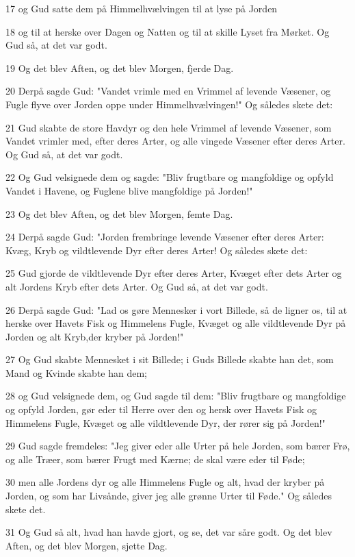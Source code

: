 \par 17 og Gud satte dem på Himmelhvælvingen til at lyse på Jorden
\par 18 og til at herske over Dagen og Natten og til at skille Lyset fra Mørket. Og Gud så, at det var godt.
\par 19 Og det blev Aften, og det blev Morgen, fjerde Dag.
\par 20 Derpå sagde Gud: "Vandet vrimle med en Vrimmel af levende Væsener, og Fugle flyve over Jorden oppe under Himmelhvælvingen!" Og således skete det:
\par 21 Gud skabte de store Havdyr og den hele Vrimmel af levende Væsener, som Vandet vrimler med, efter deres Arter, og alle vingede Væsener efter deres Arter. Og Gud så, at det var godt.
\par 22 Og Gud velsignede dem og sagde: "Bliv frugtbare og mangfoldige og opfyld Vandet i Havene, og Fuglene blive mangfoldige på Jorden!"
\par 23 Og det blev Aften, og det blev Morgen, femte Dag.
\par 24 Derpå sagde Gud: "Jorden frembringe levende Væsener efter deres Arter: Kvæg, Kryb og vildtlevende Dyr efter deres Arter! Og således skete det:
\par 25 Gud gjorde de vildtlevende Dyr efter deres Arter, Kvæget efter dets Arter og alt Jordens Kryb efter dets Arter. Og Gud så, at det var godt.
\par 26 Derpå sagde Gud: "Lad os gøre Mennesker i vort Billede, så de ligner os, til at herske over Havets Fisk og Himmelens Fugle, Kvæget og alle vildtlevende Dyr på Jorden og alt Kryb,der kryber på Jorden!"
\par 27 Og Gud skabte Mennesket i sit Billede; i Guds Billede skabte han det, som Mand og Kvinde skabte han dem;
\par 28 og Gud velsignede dem, og Gud sagde til dem: "Bliv frugtbare og mangfoldige og opfyld Jorden, gør eder til Herre over den og hersk over Havets Fisk og Himmelens Fugle, Kvæget og alle vildtlevende Dyr, der rører sig på Jorden!"
\par 29 Gud sagde fremdeles: "Jeg giver eder alle Urter på hele Jorden, som bærer Frø, og alle Træer, som bærer Frugt med Kærne; de skal være eder til Føde;
\par 30 men alle Jordens dyr og alle Himmelens Fugle og alt, hvad der kryber på Jorden, og som har Livsånde, giver jeg alle grønne Urter til Føde." Og således skete det.
\par 31 Og Gud så alt, hvad han havde gjort, og se, det var såre godt. Og det blev Aften, og det blev Morgen, sjette Dag.

